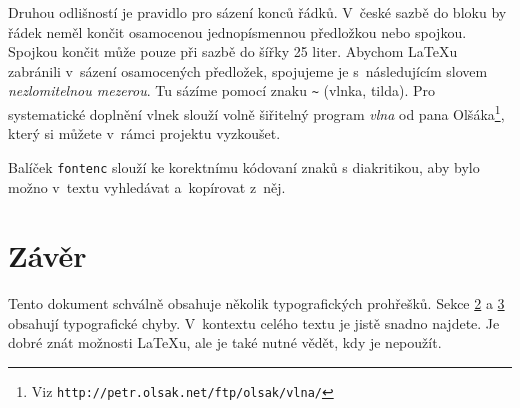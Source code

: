 \documentclass[czech,a4paper,10pt,twocolumn]{article}
\begin{document}
Druhou odlišností je pravidlo pro sázení konců řádků. V~české sazbě do bloku by řádek neměl končit osamocenou jednopísmennou předložkou nebo spojkou. Spojkou  končit může pouze při sazbě do šířky 25 liter. Abychom \LaTeX u zabránili v~sázení osamocených předložek, spojujeme je s~následujícím slovem \textit{nezlomitelnou mezerou}. Tu sázíme pomocí znaku \verb|~| (vlnka, tilda). Pro systematické doplnění vlnek slouží volně šiřitelný program \textit{vlna} od pana Olšáka\footnote{Viz  \texttt{http://petr.olsak.net/ftp/olsak/vlna/}}, který si můžete v~rámci projektu vyzkoušet.

Balíček \texttt{fontenc} slouží ke korektnímu kódovaní znaků s diakritikou, aby bylo možno v~textu vyhledávat a~kopírovat z~něj.

\section{Závěr}
Tento dokument schválně obsahuje několik typografických prohřešků. Sekce \hyperlink{d1}{2} a \hyperlink{d1}{3} obsahují typografické chyby. V~kontextu celého textu je jistě snadno najdete. Je dobré znát možnosti \LaTeX u, ale je také nutné vědět, kdy je nepoužít.
\end{document}
